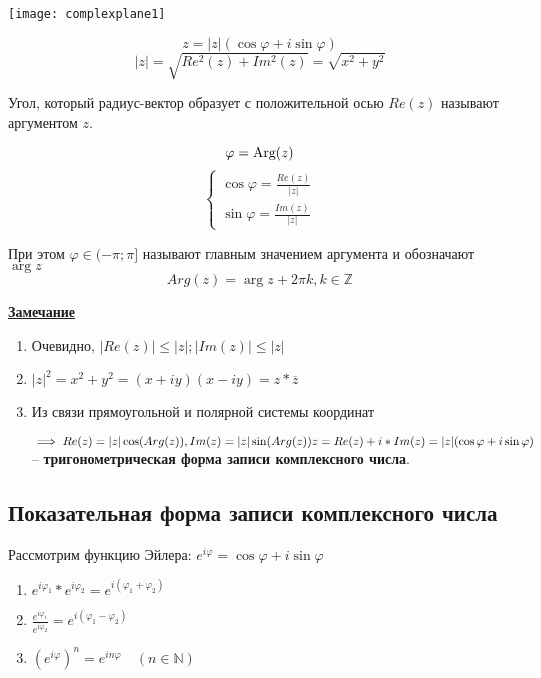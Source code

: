 \texttt{[image: complexplane1]}

\[z = |z|(\cos  \varphi + i \sin  \varphi)\]
\[|z| = \sqrt{Re^2(z) + Im^2(z)} = \sqrt{x^2 + y^2}\]

Угол, который радиус-вектор образует с положительной осью $Re(z)$
называют аргументом $z$.

\[ \varphi = \textnormal{Arg}(z)\]
\[
    \begin{cases}
        \cos  \varphi = \frac{Re(z)}{|z|} \\
        \sin  \varphi = \frac{Im(z)}{|z|}
    \end{cases}
\]

При этом $ \varphi \in (-\pi; \pi]$ называют главным значением аргумента и обозначают $\arg z$
\[Arg(z) = \arg z + 2 \pi k, k \in \mathbb{Z}\]

\parspace

\underline{\textbf{Замечание}}

\begin{enumerate}
    \item Очевидно, $|Re(z)| \le |z|; |Im(z)| \le |z|$
    \item $|z|^2 = x^2 + y^2 = (x + iy)(x - iy) = z * \overline{z}$
    \item Из связи прямоугольной и полярной системы координат 
    
    $\implies Re(z) = |z| \cos (Arg(z)), Im(z) = |z| \sin (Arg(z)) \\
    z = Re(z) + i*Im(z) = |z|(\cos  \varphi + i \sin  \varphi)$ -- \textbf{тригонометрическая
    форма записи комплексного числа}.
\end{enumerate}

\subsection{Показательная форма записи комплексного числа}

Рассмотрим функцию Эйлера: $e^{i  \varphi} = \cos  \varphi + i \sin  \varphi$

\begin{theorem}
    \begin{enumerate}
        \item $e^{i  \varphi_1} * e^{i  \varphi_2} = e^{i( \varphi_1 +  \varphi_2)}$
        \item $\frac{e^{i  \varphi_1}}{e^{i  \varphi_2}} = e^{i( \varphi_1 -  \varphi_2)}$
        \item $(e^{i  \varphi})^n = e^{i n  \varphi} \quad (n \in \mathbb{N})$
    \end{enumerate}    
\end{theorem}

